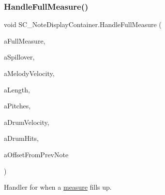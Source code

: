 \subsubsection{\texorpdfstring{Handle\+Full\+Measure()}{HandleFullMeasure()}}
{\footnotesize\ttfamily void S\+C\+\_\+\+Note\+Display\+Container.\+Handle\+Full\+Measure (\begin{DoxyParamCaption}\item[{\hyperlink{class_s_c___measure_display_panel}{S\+C\+\_\+\+Measure\+Display\+Panel}}]{a\+Full\+Measure,  }\item[{float}]{a\+Spillover,  }\item[{int}]{a\+Melody\+Velocity,  }\item[{\hyperlink{group___music_enums_gaf11b5f079adbb21c800b9eca1c5c3cbd}{Music.\+N\+O\+T\+E\+\_\+\+L\+E\+N\+G\+TH}}]{a\+Length,  }\item[{\hyperlink{group___music_enums_ga508f69b199ea518f935486c990edac1d}{Music.\+P\+I\+T\+CH} \mbox{[}$\,$\mbox{]}}]{a\+Pitches,  }\item[{int}]{a\+Drum\+Velocity,  }\item[{\hyperlink{group___music_enums_gade475b4382c7066d1af13e7c13c029b6}{Music.\+D\+R\+UM} \mbox{[}$\,$\mbox{]}}]{a\+Drum\+Hits,  }\item[{\hyperlink{group___music_enums_gaf11b5f079adbb21c800b9eca1c5c3cbd}{Music.\+N\+O\+T\+E\+\_\+\+L\+E\+N\+G\+TH}}]{a\+Offset\+From\+Prev\+Note }\end{DoxyParamCaption})}



Handler for when a \hyperlink{group___doc_s_c___m_d_p}{measure} fills up. 


